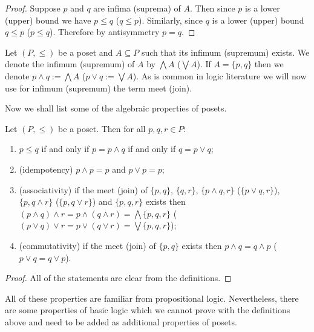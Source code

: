 \begin{proof}
Suppose $p$ and $q$ are infima (suprema) of $A$. Then since $p$ is a lower (upper) bound we have $p\leq q$ ($q\leq p$). Similarly, since $q$ is a lower (upper) bound $q\leq p$ ($p\leq q$). Therefore by antisymmetry $p=q$.  
\end{proof}

\begin{notation}
Let $(P,\leq)$ be a poset and $A\subseteq P$ such that its infimum (supremum) exists. We denote the infimum (supremum) of $A$ by $\bigwedge A$ ($\bigvee A$). If $A=\{p,q\}$ then we denote $p\wedge q :=\bigwedge A$ ($p\vee q := \bigvee A$). As is common in logic literature we will now use for infimum (supremum) the term meet (join). 
\end{notation}

Now we shall list some of the algebraic properties of posets.

\begin{theorem}\label{thm:logic_algebra}
Let $(P,\leq)$ be a poset. Then for all $p,q,r\in P$:
\begin{enumerate}
\item $p\leq q$ if and only if $p=p\wedge q$ if and only if $q =p\vee q$;
\item (idempotency) $p\wedge p = p$ and $p\vee p=p$;
\item (associativity) if the meet (join) of $\{p,q\}$, $\{q,r\}$, $\{p\wedge q, r\}$ ($\{p\vee q, r\}$), $\{p,q\wedge r\}$ ($\{p,q\vee r\}$) and $\{p,q,r\}$ exists then $(p\wedge q)\wedge r=p\wedge(q\wedge r)=\bigwedge \{p, q, r\}$ ($(p\vee q)\vee r=p\vee(q\vee r)=\bigvee \{p, q, r\}$);
\item (commutativity) if the meet (join) of $\{p,q\}$ exists then $p\wedge q = q\wedge p$ ($p\vee q = q\vee p$).
\end{enumerate}
\end{theorem}
\begin{proof}
All of the statements are clear from the definitions.
\end{proof}

All of these properties are familiar from propositional logic. Nevertheless, there are some properties of basic logic which we cannot prove with the definitions above and need to be added as additional properties of posets.

